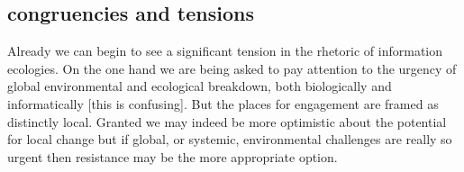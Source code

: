 \subsection{congruencies and tensions}

Already we can begin to see a significant tension in the rhetoric of information ecologies. On the one hand we are being asked to pay attention to the urgency of global environmental and ecological breakdown, both biologically and informatically [this is confusing]. But the places for engagement are framed as distinctly local. Granted we may indeed be more optimistic about the potential for local change but if global, or systemic, environmental challenges are really so urgent then resistance may be the more appropriate option.